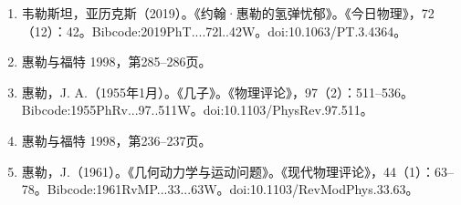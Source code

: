 \begin{enumerate}
\item 韦勒斯坦，亚历克斯（2019）。《约翰·惠勒的氢弹忧郁》。《今日物理》，72（12）：42。Bibcode:2019PhT....72l..42W。doi:10.1063/PT.3.4364。
\item 惠勒与福特 1998，第285–286页。
\item 惠勒，J. A.（1955年1月）。《几子》。《物理评论》，97（2）：511–536。Bibcode:1955PhRv...97..511W。doi:10.1103/PhysRev.97.511。
\item 惠勒与福特 1998，第236–237页。
\item 惠勒，J.（1961）。《几何动力学与运动问题》。《现代物理评论》，44（1）：63–78。Bibcode:1961RvMP...33...63W。doi:10.1103/RevModPhys.33.63。

\end{enumerate}